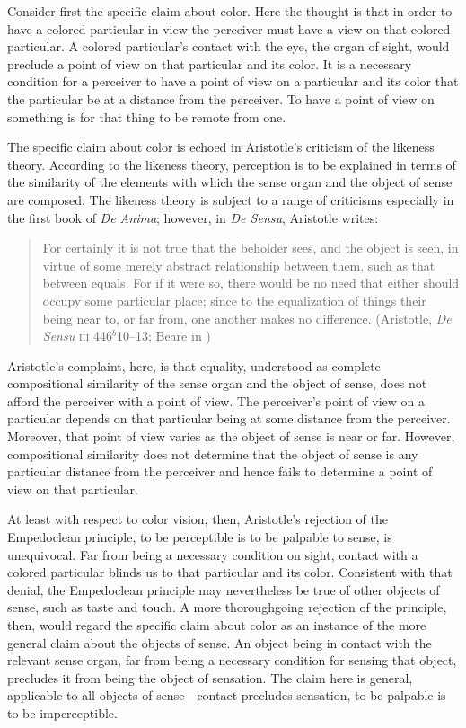 Consider first the specific claim about color. Here the thought is that in order to have a colored particular in view the perceiver must have a view on that colored particular. A colored particular's contact with the eye, the organ of sight, would preclude a point of view on that particular and its color. It is a necessary condition for a perceiver to have a point of view on a particular and its color that the particular be at a distance from the perceiver. To have a point of view on something is for that thing to be remote from one. 

The specific claim about color is echoed in Aristotle's criticism of the likeness theory. According to the likeness theory, perception is to be explained in terms of the similarity of the elements with which the sense organ and the object of sense are composed. The likeness theory is subject to a range of criticisms especially in the first book of \emph{De Anima}; however, in \emph{De Sensu}, Aristotle writes:
\begin{quote}
	For certainly it is not true that the beholder sees, and the object is seen, in virtue of some merely abstract relationship between them, such as that between equals. For if it were so, there would be no need that either should occupy some particular place; since to the equalization of things their being near to, or far from, one another makes no difference. (Aristotle, \emph{De Sensu} \textsc{iii} 446\( ^{b} \)10--13; Beare in \citealt[20]{Barnes:1984uq})
\end{quote} 
Aristotle's complaint, here, is that equality, understood as complete compositional similarity of the sense organ and the object of sense, does not afford the perceiver with a point of view. The perceiver's point of view on a particular depends on that particular being at some distance from the perceiver. Moreover, that point of view varies as the object of sense is near or far. However, compositional similarity does not determine that the object of sense is any particular distance from the perceiver and hence fails to determine a point of view on that particular.

At least with respect to color vision, then, Aristotle's rejection of the Empedoclean principle, to be perceptible is to be palpable to sense, is unequivocal. Far from being a necessary condition on sight, contact with a colored particular blinds us to that particular and its color. Consistent with that denial, the Empedoclean principle may nevertheless be true of other objects of sense, such as taste and touch. A more thoroughgoing rejection of the principle, then, would regard the specific claim about color as an instance of the more general claim about the objects of sense. An object being in contact with the relevant sense organ, far from being a necessary condition for sensing that object, precludes it from being the object of sensation. The claim here is general, applicable to all objects of sense---contact precludes sensation, to be palpable is to be imperceptible.

